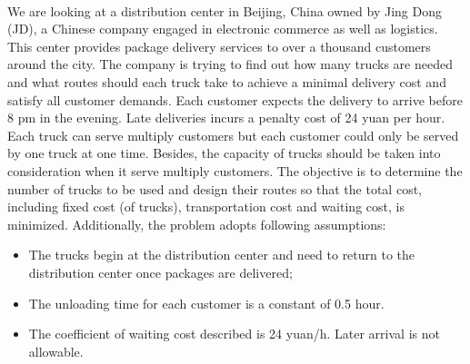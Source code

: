 \documentclass[12pt]{article}
\numberwithin{equation}{section}
\begin{document}
	\paragraph{}We are looking at a distribution center in Beijing, China owned by Jing Dong (JD), a Chinese company engaged in electronic commerce as well as logistics. This center provides package delivery services to over a thousand customers around the city. The company is trying to find out how many trucks are needed and what routes should each truck take to achieve a minimal delivery cost and satisfy all customer demands. Each customer expects the delivery to arrive before 8 pm in the evening. Late deliveries incurs a penalty cost of 24 yuan per hour. Each truck can serve multiply customers but each customer could only be served by one truck at one time. Besides, the capacity of trucks should be taken into consideration when it serve multiply customers. The objective is to determine the number of trucks to be used and design their routes so that the total cost, including fixed cost (of trucks), transportation cost and waiting cost, is minimized. Additionally, the problem adopts following assumptions:

	\begin{itemize}
	\item The trucks begin at the distribution center and need to return to the distribution center once packages are delivered;
	\item The unloading time for each customer is a constant of 0.5 hour.
	\item The coefficient of waiting cost described is 24 yuan/h. Later arrival is not allowable.
	\end{itemize}
	
\end{document}
